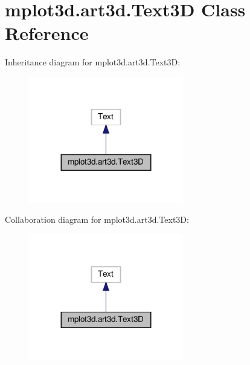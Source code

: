 \hypertarget{classmplot3d_1_1art3d_1_1Text3D}{}\section{mplot3d.\+art3d.\+Text3D Class Reference}
\label{classmplot3d_1_1art3d_1_1Text3D}


Inheritance diagram for mplot3d.\+art3d.\+Text3D\+:
\nopagebreak
\begin{figure}[H]
\begin{center}
\leavevmode
\includegraphics[width=191pt]{classmplot3d_1_1art3d_1_1Text3D__inherit__graph}
\end{center}
\end{figure}


Collaboration diagram for mplot3d.\+art3d.\+Text3D\+:
\nopagebreak
\begin{figure}[H]
\begin{center}
\leavevmode
\includegraphics[width=191pt]{classmplot3d_1_1art3d_1_1Text3D__coll__graph}
\end{center}
\end{figure}
